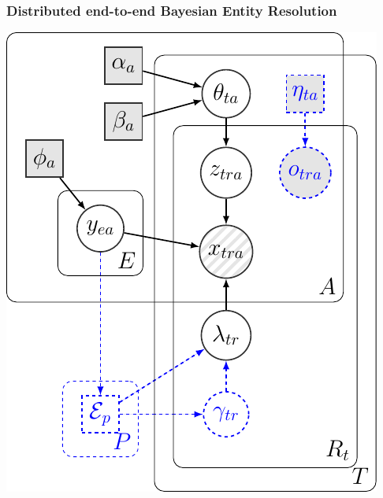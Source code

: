 \documentclass[9pt]{beamer}
\begin{document}

\begin{frame}
\frametitle{Distributed end-to-end Bayesian Entity Resolution}
 
 \vspace{3mm}
 \begin{center}
  \includegraphics[width=\linewidth,height=0.85\textheight,keepaspectratio]{./figs/plate-diagram2.pdf} 
 \end{center}
\end{frame}

\end{document}
